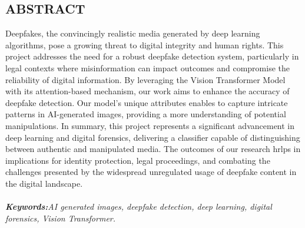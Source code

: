 \begin{center}


    \section*{ABSTRACT}
    \justify

    Deepfakes, the convincingly realistic  media generated by deep learning algorithms, pose a growing threat to digital integrity and human rights. This project addresses the need for a robust deepfake detection system, particularly in legal contexts where misinformation can impact outcomes and compromise the reliability of digital information. By leveraging the Vision Transformer Model with its attention-based mechanism, our work aims to enhance the accuracy of deepfake detection. Our model's unique attributes enables to capture intricate patterns in AI-generated images, providing a more understanding of potential manipulations. In summary, this project represents a significant advancement in deep learning and digital forensics, delivering a classifier capable of distinguishing between authentic and manipulated media. The outcomes of our research hrlps in implications for identity protection, legal proceedings, and combating the challenges presented by the widespread unregulated usage of deepfake content in the digital landscape.\\
    \\
    \textit{\textbf{Keywords:}AI generated images, deepfake detection, deep learning, digital forensics, Vision Transformer.}


\end{center}